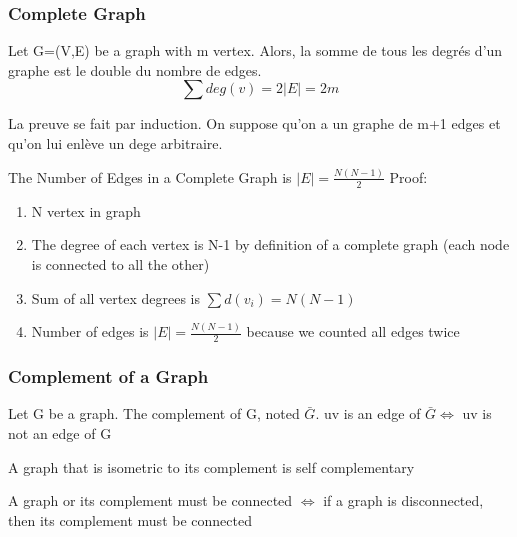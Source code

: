 \documentclass{article}
\begin{document}
\subsubsection{Complete Graph}%
\label{ssub:Complete Graph}

\begin{theorem}
    Let G=(V,E) be a graph with m vertex. Alors, la somme de tous les
    degrés d'un graphe est le double du nombre de edges.
    $$ \sum deg(v) = 2 |E| = 2m$$
\end{theorem}

\begin{remark}
    La preuve se fait par induction. On suppose qu'on a un graphe de m+1
    edges et qu'on lui enlève un dege arbitraire.
\end{remark}

\begin{theorem}
    The Number of Edges in a Complete Graph is $ |E| = \frac{N(N-1)}{2} $
    Proof:
    \begin{enumerate}
	\item N vertex in graph
	\item The degree of each vertex is N-1 by definition of a complete
	    graph (each node is connected to all the other)
	\item Sum of all vertex degrees is $\sum d(v_i) = N(N-1)$
	\item Number of edges is $ |E| = \frac{N(N-1)}{2} $ because we
	    counted all edges twice
    \end{enumerate}
\end{theorem}

\subsubsection{Complement of a Graph}%
\label{ssub:Complement of a Graph}

\begin{definition}
    Let G be a graph. The complement of G, noted $\bar G$. uv is an edge of
    $\bar G \Longleftrightarrow $ uv is not an edge of G
\end{definition}

\begin{definition}
    A graph that is isometric to its complement is self complementary
\end{definition}

\begin{theorem}
    A graph or its complement must be connected $\Longleftrightarrow$
    if a graph is disconnected, then its complement must be connected
\end{theorem}
\end{document}
